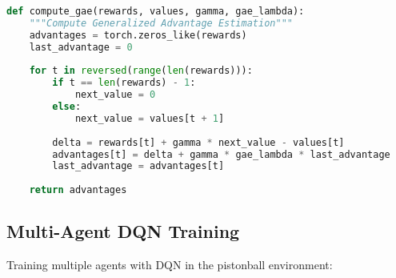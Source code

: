 \begin{lstlisting}[language=python, caption=Basic PPO Training]
def compute_gae(rewards, values, gamma, gae_lambda):
    """Compute Generalized Advantage Estimation"""
    advantages = torch.zeros_like(rewards)
    last_advantage = 0
    
    for t in reversed(range(len(rewards))):
        if t == len(rewards) - 1:
            next_value = 0
        else:
            next_value = values[t + 1]
        
        delta = rewards[t] + gamma * next_value - values[t]
        advantages[t] = delta + gamma * gae_lambda * last_advantage
        last_advantage = advantages[t]
    
    return advantages
\end{lstlisting}

\subsection{Multi-Agent DQN Training}

Training multiple agents with DQN in the pistonball environment:

